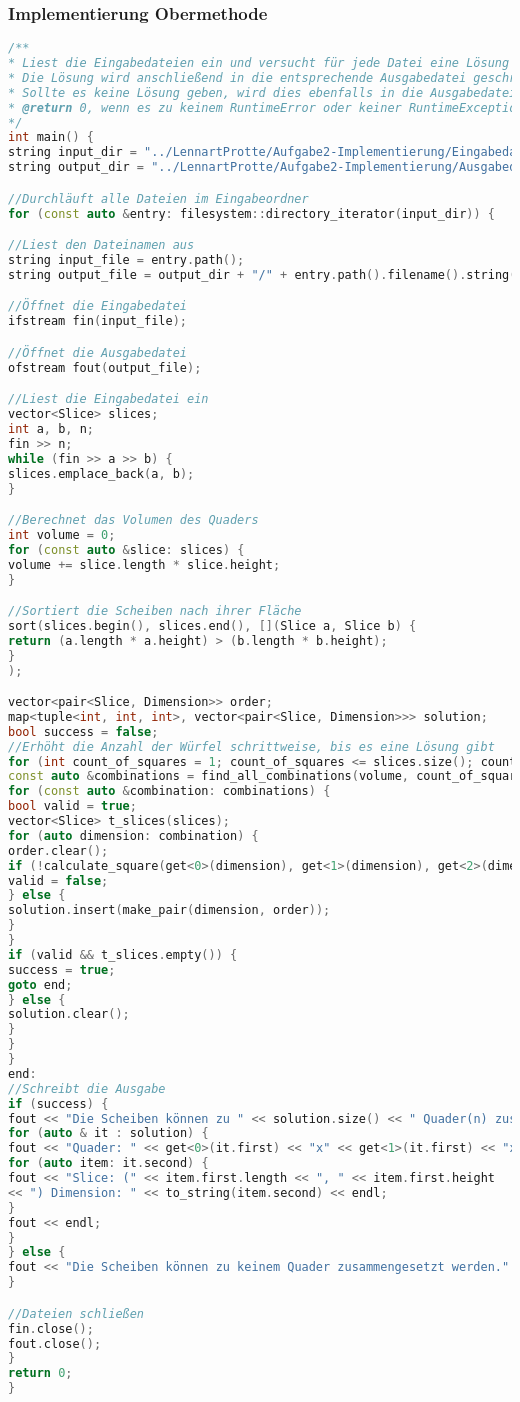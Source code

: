 \documentclass[a4paper,10pt,ngerman]{scrartcl}
\begin{document}
    \subsubsection{Implementierung Obermethode}
    \begin{lstlisting}[frame=single,language=C++,title=Methode main,breaklines=true,label={lst:code_main_extended}]
/**
* Liest die Eingabedateien ein und versucht für jede Datei eine Lösung entsprechend der Aufgabenstellung zu finden
* Die Lösung wird anschließend in die entsprechende Ausgabedatei geschrieben
* Sollte es keine Lösung geben, wird dies ebenfalls in die Ausgabedatei geschrieben
* @return 0, wenn es zu keinem RuntimeError oder keiner RuntimeException gekommen ist
*/
int main() {
string input_dir = "../LennartProtte/Aufgabe2-Implementierung/Eingabedateien_b";
string output_dir = "../LennartProtte/Aufgabe2-Implementierung/Ausgabedateien_b";

//Durchläuft alle Dateien im Eingabeordner
for (const auto &entry: filesystem::directory_iterator(input_dir)) {

//Liest den Dateinamen aus
string input_file = entry.path();
string output_file = output_dir + "/" + entry.path().filename().string();

//Öffnet die Eingabedatei
ifstream fin(input_file);

//Öffnet die Ausgabedatei
ofstream fout(output_file);

//Liest die Eingabedatei ein
vector<Slice> slices;
int a, b, n;
fin >> n;
while (fin >> a >> b) {
slices.emplace_back(a, b);
}

//Berechnet das Volumen des Quaders
int volume = 0;
for (const auto &slice: slices) {
volume += slice.length * slice.height;
}

//Sortiert die Scheiben nach ihrer Fläche
sort(slices.begin(), slices.end(), [](Slice a, Slice b) {
return (a.length * a.height) > (b.length * b.height);
}
);

vector<pair<Slice, Dimension>> order;
map<tuple<int, int, int>, vector<pair<Slice, Dimension>>> solution;
bool success = false;
//Erhöht die Anzahl der Würfel schrittweise, bis es eine Lösung gibt
for (int count_of_squares = 1; count_of_squares <= slices.size(); count_of_squares++) {
const auto &combinations = find_all_combinations(volume, count_of_squares, slices);
for (const auto &combination: combinations) {
bool valid = true;
vector<Slice> t_slices(slices);
for (auto dimension: combination) {
order.clear();
if (!calculate_square(get<0>(dimension), get<1>(dimension), get<2>(dimension), order, t_slices)) {
valid = false;
} else {
solution.insert(make_pair(dimension, order));
}
}
if (valid && t_slices.empty()) {
success = true;
goto end;
} else {
solution.clear();
}
}
}
end:
//Schreibt die Ausgabe
if (success) {
fout << "Die Scheiben können zu " << solution.size() << " Quader(n) zusammengesetzt werden." << endl;
for (auto & it : solution) {
fout << "Quader: " << get<0>(it.first) << "x" << get<1>(it.first) << "x" << get<2>(it.first) << endl;
for (auto item: it.second) {
fout << "Slice: (" << item.first.length << ", " << item.first.height
<< ") Dimension: " << to_string(item.second) << endl;
}
fout << endl;
}
} else {
fout << "Die Scheiben können zu keinem Quader zusammengesetzt werden." << endl;
}

//Dateien schließen
fin.close();
fout.close();
}
return 0;
}
    \end{lstlisting}
\end{document}

